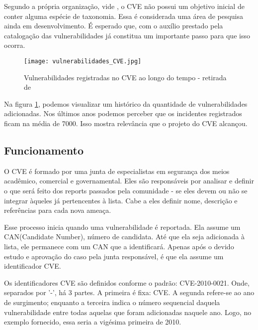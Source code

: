 			Segundo a própria organização, vide \cite{CVE2010}, o CVE não possui um objetivo 
			inicial de conter alguma espécie de taxonomia. Essa é considerada uma área de pesquisa
			ainda em desenvolvimento. É esperado que, com o auxílio prestado pela
			catalogação das vulnerabilidades já constitua um importante passo para que
			isso ocorra.

			\begin{figure}
				\begin{center}
					\texttt{[image: vulnerabilidades\_CVE.jpg]}
					\caption{Vulnerabilidades registradas no CVE ao longo do tempo - retirada 
							de \cite{Florian2009}}
					\label{fig:vulnerabilidades_CVE}
				\end{center}
			\end{figure}

			
			Na figura \ref{fig:vulnerabilidades_CVE}, podemos visualizar um histórico
			da quantidade de vulnerabilidades adicionadas. Nos últimos anos podemos
			perceber que os incidentes registrados ficam na média de 7000.
			Isso mostra relevância que o projeto do CVE alcançou.
			
			 
		
		\subsection{Funcionamento}
			O CVE é formado por uma junta de especialistas em segurança dos meios acadêmico, comercial e
			governamental. Eles são responsáveis por analisar e definir o que será feito dos reports passados
			pela comunidade - se eles devem ou não se integrar àqueles já pertencentes à lista.
			Cabe a eles definir nome, descrição e referências para cada nova ameaça.


			Esse processo inicia quando uma vulnerabilidade é reportada.
			Ela assume um CAN(Candidate Number), número de candidata.
			Até que ela seja adicionada à lista, ele permanece com um CAN que
			a identificará. Apenas após o devido estudo e aprovação do caso pela junta
			responsável, é que ela assume um identificador CVE.

			
			Os identificadores CVE são definidos conforme o padrão: CVE-2010-0021.
			Onde, separados por '-', há 3 partes. A primeira é fixa: CVE.
			A segunda refere-se ao ano de surgimento; enquanto a terceira
			indica o número sequencial daquela vulnerabilidade entre todas
			aquelas que foram adicionadas naquele ano. Logo, no exemplo fornecido,
			essa seria a vigésima primeira de 2010.
		
